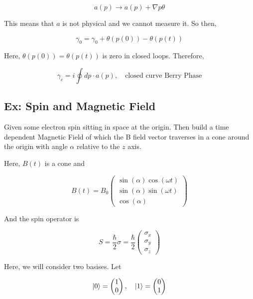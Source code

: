 \documentclass{article}
\newtheorem{one minute paper}[theorem]{One Minute Paper}
\begin{document}
\begin{equation}
    a(p) \rightarrow a(p) + \nabla p \theta
\end{equation}

This means that $a$ is not physical and we cannot measure it. So then, 

$$\gamma_0 = \gamma_0 + \theta(p(0)) - \theta(p(t))$$

Here, $\theta(p(0)) = \theta(p(t))$ is zero in closed loops. Therefore, 

\begin{equation}
    \gamma_c = i\oint dp \cdot a(p), \quad \text{closed curve Berry Phase}
\end{equation}

\subsection*{Ex: Spin and Magnetic Field}

Given some electron spin sitting in space at the origin. 
Then build a time dependent Magnetic Field of which the B field vector traverses in a cone around the origin with angle $\alpha$ relative to the $z$ axis. 

Here, $B(t)$ is a cone and 

\begin{equation}
    B(t) = B_0 \begin{pmatrix}
        \sin(\alpha)\cos(\omega t) \\
        \sin(\alpha)\sin(\omega t)\\
        \cos(\alpha)
    \end{pmatrix}
\end{equation}

And the spin operator is 

\begin{equation}
    S = \frac{\hbar}{2}\sigma = \frac{\hbar}{2}\begin{pmatrix}
        \sigma_x \\
        \sigma_y \\
        \sigma_z
    \end{pmatrix}
\end{equation}

Here, we will consider two basises. Let 

\begin{equation}
    \ket{0} = \begin{pmatrix}
        1 \\
        0
    \end{pmatrix}, \quad \ket{1} = \begin{pmatrix}
        0 \\
        1
    \end{pmatrix}
\end{equation}
\end{document}
